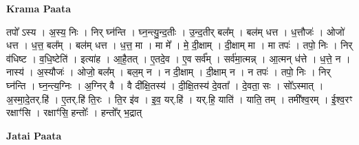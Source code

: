 \documentclass[17pt]{extarticle}
\begin{document}
\textbf{Krama Paata} \newline

तपो᳚ ऽस्य । अ॒स्य॒ निः । निर् घ्न॑न्ति । घ्न॒न्त्यु॒न्द॒तीः । उ॒न्द॒तीर् बल᳚म् । बल॑म् धत्त । ध॒त्तौजः॑ । ओजो॑ धत्त । ध॒त्त॒ बल᳚म् । बल॑म् धत्त । ध॒त्त॒ मा । मा मे᳚ । मे॒ दी॒क्षाम् । दी॒क्षाम् मा । मा तपः॑ । तपो॒ निः । निर् व॑धिष्ट । व॒धि॒ष्टेति॑ । इत्या॑ह । आ॒है॒तत् । ए॒तदे॒व । ए॒व सर्व᳚म् । सर्व॑मा॒त्मन्न् । आ॒त्मन् ध॑त्ते । ध॒त्ते॒ न । नास्य॑ । अ॒स्यौजः॑ । ओजो॒ बल᳚म् । बल॒म् न । न दी॒क्षाम् । दी॒क्षाम् न । न तपः॑ । तपो॒ निः । निर् घ्न॑न्ति । घ्न॒न्त्य॒ग्निः । अ॒ग्निर् वै । वै दी᳚क्षि॒तस्य॑ । दी॒क्षि॒तस्य॑ दे॒वता᳚ । दे॒वता॒ सः । सो᳚ऽस्मात् । अ॒स्मा॒दे॒तर्.हि॑ । ए॒तर्.हि॑ ति॒रः । ति॒र इ॑व । इ॒व॒ यर्.हि॑ । यर्.हि॒ याति॑ । याति॒ तम् । तमी᳚श्व॒रम् । ई॒श्व॒रꣳ रक्षाꣳ॑सि । रक्षाꣳ॑सि॒ हन्तोः᳚ । हन्तो᳚र् भ॒द्रात् \newline

\textbf{Jatai Paata} \newline
\end{document}

